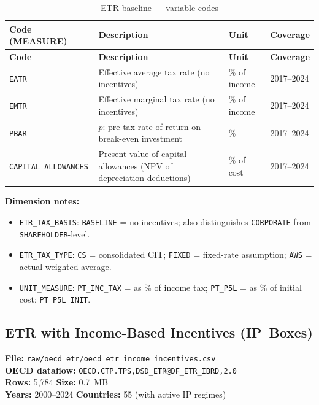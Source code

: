 \documentclass[11pt,a4paper]{article}
\begin{document}
\begin{longtable}{L{2.8cm} L{6.0cm} C{2.0cm} C{2.5cm}}
    \caption{ETR baseline --- variable codes}
    \label{tab:etr_baseline}\\
    \toprule
    \textbf{Code (MEASURE)} & \textbf{Description} & \textbf{Unit} & \textbf{Coverage} \\
    \midrule
    \endfirsthead
    \toprule
    \textbf{Code} & \textbf{Description} & \textbf{Unit} & \textbf{Coverage} \\
    \midrule
    \endhead
    \bottomrule
    \endlastfoot
    \texttt{EATR}               & Effective average tax rate (no incentives) & \% of income & 2017--2024 \\
    \texttt{EMTR}               & Effective marginal tax rate (no incentives) & \% of income & 2017--2024 \\
    \texttt{PBAR}               & $\bar{p}$: pre-tax rate of return on break-even investment & \% & 2017--2024 \\
    \texttt{CAPITAL\_ALLOWANCES}& Present value of capital allowances (NPV of depreciation deductions) & \% of cost & 2017--2024 \\
\end{longtable}

\noindent\textbf{Dimension notes:}
\begin{itemize}[noitemsep]
    \item \texttt{ETR\_TAX\_BASIS}: \texttt{BASELINE} = no incentives; also
    distinguishes \texttt{CORPORATE} from \texttt{SHAREHOLDER}-level.
    \item \texttt{ETR\_TAX\_TYPE}: \texttt{CS} = consolidated CIT;
    \texttt{FIXED} = fixed-rate assumption; \texttt{AWS} = actual weighted-average.
    \item \texttt{UNIT\_MEASURE}: \texttt{PT\_INC\_TAX} = as \% of income tax;
    \texttt{PT\_P5L} = as \% of initial cost; \texttt{PT\_P5L\_INIT}.
\end{itemize}

\subsection{ETR with Income-Based Incentives (IP~Boxes)}
\label{subsec:etr_income}

\textbf{File:} \texttt{raw/oecd\_etr/oecd\_etr\_income\_incentives.csv}\\
\textbf{OECD dataflow:} \texttt{OECD.CTP.TPS,DSD\_ETR@DF\_ETR\_IBRD,2.0}\\
\textbf{Rows:} 5{,}784 \quad \textbf{Size:} 0.7~MB\\
\textbf{Years:} 2000--2024 \quad \textbf{Countries:} 55 (with active IP regimes)
\end{document}

